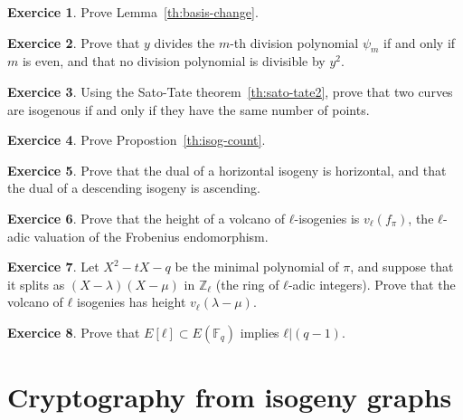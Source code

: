 \documentclass[10pt]{article}
\theoremstyle{plain}
\theoremstyle{definition}
\newtheorem{exercice}{Exercice}[part]
\def\F{\ensuremath{\mathbb{F}}}
\begin{document}
\begin{exercice}
  Prove Lemma~\ref{th:basis-change}.
\end{exercice}

\begin{exercice}
  Prove that $y$ divides the $m$-th division polynomial $ψ_m$ if and
  only if $m$ is even, and that no division polynomial is divisible by
  $y^2$.
\end{exercice}

\begin{exercice}
  Using the Sato-Tate theorem~\ref{th:sato-tate2}, prove that two
  curves are isogenous if and only if they have the same number of
  points.
\end{exercice}

\begin{exercice}
  Prove Propostion~\ref{th:isog-count}.
\end{exercice}

\begin{exercice}
  Prove that the dual of a horizontal isogeny is horizontal, and that
  the dual of a descending isogeny is ascending.
\end{exercice}

\begin{exercice}
  Prove that the height of a volcano of $ℓ$-isogenies is $v_ℓ(f_π)$,
  the $ℓ$-adic valuation of the Frobenius endomorphism.
\end{exercice}

\begin{exercice}
  Let $X^2-tX-q$ be the minimal polynomial of $π$, and suppose that it
  splits as $(X-λ)(X-μ)$ in $ℤ_ℓ$ (the ring of $ℓ$-adic integers). %
  Prove that the volcano of $ℓ$ isogenies has height $v_ℓ(λ-μ)$.
\end{exercice}

\begin{exercice}
  \label{ex:group-struct}
  Prove that $E[ℓ]⊂E(\F_q)$ implies $ℓ|(q-1)$.
\end{exercice}


\clearpage
\part{Cryptography from isogeny graphs }

\end{document}
